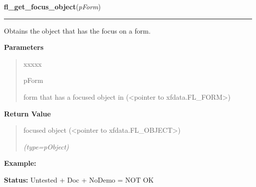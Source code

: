 \hspace{.8\funcindent}\begin{boxedminipage}{\funcwidth}

    \raggedright \textbf{fl\_get\_focus\_object}(\textit{pForm})

    \vspace{-1.5ex}

    \rule{\textwidth}{0.5\fboxrule}
\setlength{\parskip}{2ex}
    Obtains the object that has the focus on a form.

\setlength{\parskip}{1ex}
      \textbf{Parameters}
      \vspace{-1ex}

      \begin{quote}
        \begin{Ventry}{xxxxx}

          \item[pForm]

          form that has a focused object in ({\textless}pointer to 
          xfdata.FL\_FORM{\textgreater})

        \end{Ventry}

      \end{quote}

      \textbf{Return Value}
    \vspace{-1ex}

      \begin{quote}
      focused object ({\textless}pointer to 
      xfdata.FL\_OBJECT{\textgreater})

      {\it (type=pObject)}

      \end{quote}

\textbf{Example:} 

\textbf{Status:} Untested + Doc + NoDemo = NOT OK



    \end{boxedminipage}

    \label{xformslib:library:fl_reset_focus_object}

    \vspace{0.5ex}

